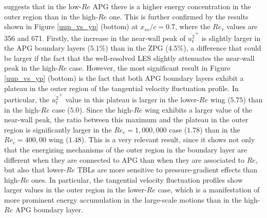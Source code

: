 \documentclass[preprint,12pt,authoryear]{elsarticle}
\begin{document}
suggests that in the low-$Re$ APG there is a higher energy concentration in the outer region than in the high-$Re$ one. This is further confirmed by the results shown in Figure \ref{uup_vs_yp} (bottom) at $x_{ss}/c=0.7$, where the $Re_{\tau}$ values are 356 and 671. Firstly, the increase in the near-wall peak of $\overline{u^{2}_{t}}^{+}$ is slightly larger in the APG boundary layers ($5.1\%$) than in the ZPG ($4.5\%$), a difference that could be larger if the fact that the well-resolved LES slightly attenuates the near-wall peak in the high-$Re$ case. However, the most significant result in Figure \ref{uup_vs_yp} (bottom) is the fact that both APG boundary layers exhibit a plateau in the outer region of the tangential velocity fluctuation profile. In particular, the $\overline{u^{2}_{t}}^{+}$ value in this plateau is larger in the lower-$Re$ wing ($5.75$) than in the high-$Re$ case ($5.0$). Since the high-$Re$ wing exhibits a larger value of the near-wall peak, the ratio between this maximum and the plateau in the outer region is significantly larger in the $Re_{c}=1,000,000$ case ($1.78$) than in the $Re_{c}=400,00$ wing ($1.48$). This is a very relevant result, since it shows not only that the energizing mechanisms of the outer region in the boundary layer are different when they are connected to APG than when they are associated to $Re$, but also that lower-$Re$ TBLs are more sensitive to pressure-gradient effects than high-$Re$ ones. In particular, the tangential velocity fluctuation profiles show larger values in the outer region in the lower-$Re$ case, which is a manifestation of more prominent energy accumulation in the large-scale motions than in the high-$Re$ APG boundary layer.
\end{document}
